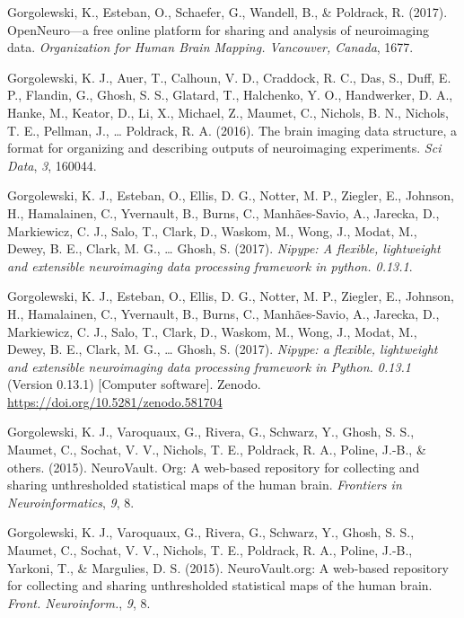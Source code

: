 \documentclass[11pt,american,]{memoir} %
\begin{document}
\leavevmode\hypertarget{ref-Gorgolewski2017-uu}{}%
Gorgolewski, K., Esteban, O., Schaefer, G., Wandell, B., \& Poldrack, R. (2017). OpenNeuro---a free online platform for sharing and analysis of neuroimaging data. \emph{Organization for Human Brain Mapping. Vancouver, Canada}, 1677.

\leavevmode\hypertarget{ref-Gorgolewski2016-in}{}%
Gorgolewski, K. J., Auer, T., Calhoun, V. D., Craddock, R. C., Das, S., Duff, E. P., Flandin, G., Ghosh, S. S., Glatard, T., Halchenko, Y. O., Handwerker, D. A., Hanke, M., Keator, D., Li, X., Michael, Z., Maumet, C., Nichols, B. N., Nichols, T. E., Pellman, J., \ldots{} Poldrack, R. A. (2016). The brain imaging data structure, a format for organizing and describing outputs of neuroimaging experiments. \emph{Sci Data}, \emph{3}, 160044.

\leavevmode\hypertarget{ref-Gorgolewski2017-gb}{}%
Gorgolewski, K. J., Esteban, O., Ellis, D. G., Notter, M. P., Ziegler, E., Johnson, H., Hamalainen, C., Yvernault, B., Burns, C., Manhães-Savio, A., Jarecka, D., Markiewicz, C. J., Salo, T., Clark, D., Waskom, M., Wong, J., Modat, M., Dewey, B. E., Clark, M. G., \ldots{} Ghosh, S. (2017). \emph{Nipype: A flexible, lightweight and extensible neuroimaging data processing framework in python. 0.13.1}.

\leavevmode\hypertarget{ref-gorgolewski_krzysztof_j_2017_581704}{}%
Gorgolewski, K. J., Esteban, O., Ellis, D. G., Notter, M. P., Ziegler, E., Johnson, H., Hamalainen, C., Yvernault, B., Burns, C., Manhães-Savio, A., Jarecka, D., Markiewicz, C. J., Salo, T., Clark, D., Waskom, M., Wong, J., Modat, M., Dewey, B. E., Clark, M. G., \ldots{} Ghosh, S. (2017). \emph{Nipype: a flexible, lightweight and extensible neuroimaging data processing framework in Python. 0.13.1} (Version 0.13.1) {[}Computer software{]}. Zenodo. \url{https://doi.org/10.5281/zenodo.581704}

\leavevmode\hypertarget{ref-gorgolewski2015neurovault}{}%
Gorgolewski, K. J., Varoquaux, G., Rivera, G., Schwarz, Y., Ghosh, S. S., Maumet, C., Sochat, V. V., Nichols, T. E., Poldrack, R. A., Poline, J.-B., \& others. (2015). NeuroVault. Org: A web-based repository for collecting and sharing unthresholded statistical maps of the human brain. \emph{Frontiers in Neuroinformatics}, \emph{9}, 8.

\leavevmode\hypertarget{ref-Gorgolewski2015-hj}{}%
Gorgolewski, K. J., Varoquaux, G., Rivera, G., Schwarz, Y., Ghosh, S. S., Maumet, C., Sochat, V. V., Nichols, T. E., Poldrack, R. A., Poline, J.-B., Yarkoni, T., \& Margulies, D. S. (2015). NeuroVault.org: A web-based repository for collecting and sharing unthresholded statistical maps of the human brain. \emph{Front. Neuroinform.}, \emph{9}, 8.
\end{document}
